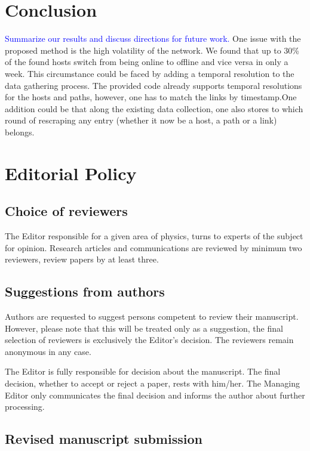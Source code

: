 \documentclass[USenglish,oneside,twocolumn]{article}
\newcommand\CONTENT[1]{\textcolor{blue}{#1}}
\begin{document}
\section{Conclusion}

\CONTENT{Summarize our results and discuss directions for future work.}
One issue with the proposed method is the high volatility of the network. We found that up to 30\% of the found hosts switch from being online to offline and vice versa in only a week. This circumstance could be faced by adding a temporal resolution to the data gathering process.
The provided code already supports temporal resolutions for the hosts and paths, however, one has to match the links by timestamp.One addition could be that along the existing data collection, one also stores to which round of rescraping any entry (whether it now be a host, a path or a link) belongs.

\section{Editorial Policy}

\subsection{Choice of reviewers}

The Editor responsible for a given area of physics, turns to experts of the subject for opinion. Research articles and communications are reviewed by minimum two reviewers, review papers by at least three.

\subsection{Suggestions from authors}

Authors are requested to suggest persons competent to review their manuscript. However, please note that this will be treated only as a suggestion, the final selection of reviewers is exclusively the Editor's decision. The reviewers remain anonymous in any case.

The Editor is fully responsible for decision about the manuscript. The final decision, whether to accept or reject a paper, rests with him/her. The Managing Editor only communicates the final decision and informs the author about further processing.

\subsection{Revised manuscript submission}
\end{document}
